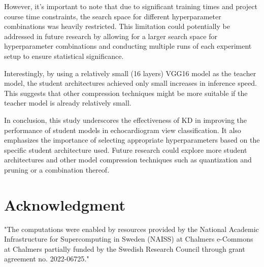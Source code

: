 \documentclass[14pt]{article}
\begin{document}
However, it's important to note that due to significant training times and project course time constraints, the search space for different hyperparameter combinations was heavily restricted. This limitation could potentially be addressed in future research by allowing for a larger search space for hyperparameter combinations and conducting multiple runs of each experiment setup to ensure statistical significance.

Interestingly, by using a relatively small (16 layers) VGG16 model as the teacher model, the student architectures achieved only small increases in inference speed. This suggests that other compression techniques might be more suitable if the teacher model is already relatively small.

In conclusion, this study underscores the effectiveness of KD in improving the performance of student models in echocardiogram view classification. It also emphasizes the importance of selecting appropriate hyperparameters based on the specific student architecture used. Future research could explore more student architectures and other model compression techniques such as quantization and pruning or a combination thereof.

\newpage
\section*{Acknowledgment}
"The computations were enabled by resources provided by the National Academic Infrastructure for Supercomputing in Sweden (NAISS) at Chalmers e-Commons at Chalmers partially funded by the Swedish Research Council through grant agreement no. 2022-06725."



\end{document}
